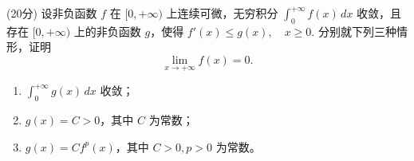 \documentclass[loose]{ExBook}
\begin{document}
\begin{qitems}
    \begin{bbox}
        \qitem (20分) 设非负函数 \( f \) 在 \([0, +\infty)\) 上连续可微，无穷积分
        \(
        \int_{0}^{+\infty} f(x) \, dx
        \)
        收敛，且存在 \([0, +\infty)\) 上的非负函数 \( g \)，使得
        \(
        f'(x) \leq g(x), \quad x \geq 0.
        \)
        分别就下列三种情形，证明
        \[
        \lim_{x \to +\infty} f(x) = 0.
        \]
        \begin{enumerate}[label=(\roman*)]
            \item \(\int_{0}^{+\infty} g(x) \, dx\) 收敛；
            \item \(g(x) = C > 0\)，其中 \(C\) 为常数；
            \item \(g(x) = Cf^p(x)\)，其中 \(C > 0, p > 0\) 为常数。
        \end{enumerate}
    \end{bbox}

\end{qitems}
\end{document}
